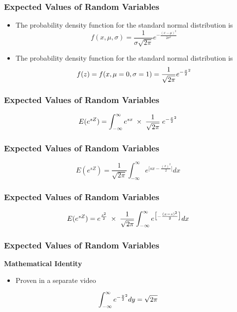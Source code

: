 \documentclass{beamer}
\begin{document}
	\begin{frame}
		\frametitle{Expected Values of Random Variables}
		\Large
		\begin{itemize}
			\item 
			The probability density function for the standard normal distribution is
			{
				\Large
				\[f(x, \mu, \sigma) = \frac{1}{\sigma\sqrt{2\pi}} e^{ -\frac{(x-\mu)^2}{2\sigma^2} }\]}
			\item 
			The probability density function for the standard normal distribution is
			{
				\Large
				\[f(z) = f(x, \mu= 0, \sigma=1) = \frac{1}{\sqrt{2\pi}} e^{ -{x \over 2}^2 }\]
			}
		\end{itemize}
	\end{frame}
	\begin{frame}
		\frametitle{Expected Values of Random Variables}
		\Large
		\vspace{-4cm}
		
		
		
		{
			\LARGE
			\[ E( e^{sZ} ) =  \int_{-\infty}^{\infty}  e^{sx} \;\times\; \frac{1}{\sqrt{2\pi}} \;e^{ -{x \over 2}^2 }\]
		}
		
		
	\end{frame}
	\begin{frame}
		\frametitle{Expected Values of Random Variables}
		\Large
		\vspace{-4cm}
		
		
		
		{
			\LARGE
			\[ E( e^{sZ} ) =  \frac{1}{\sqrt{2\pi}} \int_{-\infty}^{\infty}   e^{ \big[sx-\frac{(x)^2}{2} \big]} dx   \]
		}
		
	\end{frame}
	\begin{frame}
		\frametitle{Expected Values of Random Variables}
		\Large
		\vspace{-4cm}
		
		
		
		{
			\LARGE
			\[ E( e^{sZ} ) =  e^{{s^2\over 2}} \; \times\; \frac{1}{\sqrt{2\pi}} \int_{-\infty}^{\infty} e^{ \big[-\frac{(x-s)^2}{2} \big]} dx   \]
		}
		
	\end{frame}
	\begin{frame}
		\frametitle{Expected Values of Random Variables}
		\Large
		\vspace{-3cm}
		\textbf{Mathematical Identity}
		\begin{itemize}
			\item Proven in a separate video
		\end{itemize}
		{
			\LARGE
			\[\int_{-\infty}^{\infty} e^{-{y\over 2}^2}dy  = \sqrt{2\pi}\]
			
		}
	\end{frame}
	
\end{document}
